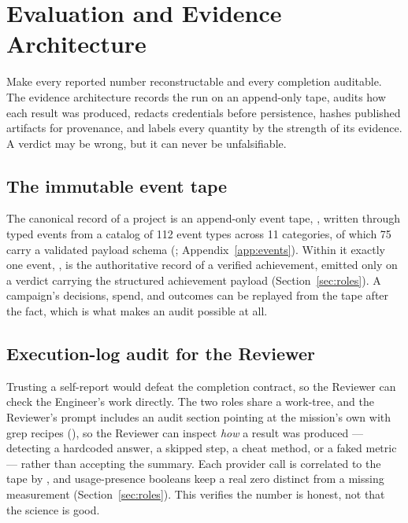 \section{Evaluation and Evidence Architecture}
\label{sec:evidence}

\begin{designbox}
Make every reported number reconstructable and every completion auditable. The
evidence architecture records the run on an append-only tape, audits how each
result was produced, redacts credentials before persistence, hashes published
artifacts for provenance, and labels every quantity by the strength of its
evidence. A verdict may be wrong, but it can never be unfalsifiable.
\end{designbox}

\subsection{The immutable event tape}

The canonical record of a project is an append-only event tape,
, written through typed events from a catalog of 112 event
types across 11 categories, of which 75 carry a validated payload schema
(; Appendix~\ref{app:events}). Within it exactly
one event, , is the authoritative record of a
verified achievement, emitted only on a  verdict carrying the structured
achievement payload (Section~\ref{sec:roles}). A campaign's decisions, spend, and
outcomes can be replayed from the tape after the fact, which is what makes an audit
possible at all.

\subsection{Execution-log audit for the Reviewer}

Trusting a self-report would defeat the completion contract, so the Reviewer can
check the Engineer's work directly. The two roles share a work-tree, and the
Reviewer's prompt includes an audit section pointing at the mission's own
 with grep recipes (), so the
Reviewer can inspect \emph{how} a result was produced --- detecting a hardcoded
answer, a skipped step, a cheat method, or a faked metric --- rather than accepting
the summary. Each provider call is correlated to the tape by , and
usage-presence booleans keep a real zero distinct from a missing measurement
(Section~\ref{sec:roles}). This verifies the number is honest, not that the science
is good.

